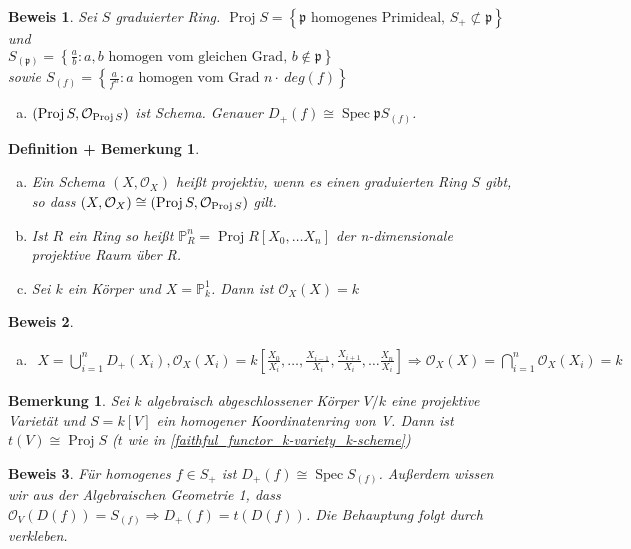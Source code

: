 \documentclass[a4paper,oneside]{scrbook}
\theoremstyle{break}
\newtheorem{DefBem}[Def]{Definition + Bemerkung}
\newtheorem{Bem}[Def]{Bemerkung}
\theoremstyle{nonumberbreak}
\theoremstyle{nonumberplain}
\newtheorem{Bew}{Beweis}
\theoremstyle{break}
\newcommand{\Spec}{%
	\ensuremath{\operatorname{Spec}}%
}
\newcommand{\Proj}{%
	\ensuremath{\operatorname{Proj}}%
}
\begin{document}
\begin{Bew}
 Sei $S$ graduierter Ring. $\Proj{S} = \left\lbrace \mathfrak{p} \text{ homogenes Primideal, } S_+ \not\subset \mathfrak{p} \right\rbrace$ und \\
$S_{(\mathfrak{p})}=\left\lbrace \frac{a}{b}: a,b \text{ homogen vom gleichen Grad, } b \notin \mathfrak{p} \right\rbrace $ \\
sowie $S_{(f)}=\left\lbrace \frac{a}{f^n}: a \text{ homogen vom Grad } n \cdot~ deg(f) \right\rbrace $
\begin{enumerate}[(g)]
 \item $(\Proj S, \mathcal{O}_{\Proj S})$ ist Schema. Genauer $D_+(f) \cong \Spec{\mathfrak{p} S_{(f)}}$.  
\end{enumerate}

\end{Bew}

\begin{DefBem}
	\begin{enumerate}[(a)]
		\item Ein Schema $(X,\mathcal{O}_X)$ heißt projektiv, wenn es einen graduierten Ring $S$ gibt, so dass $(X,\mathcal{O}_X) \cong (\Proj S, \mathcal{O}_{\Proj S})$  gilt.
		\item Ist $R$ ein Ring so heißt $\mathbb{P}^n_R = \Proj {R[X_0,\dots X_n]}$ der n-dimensionale projektive Raum über R.
		\item Sei $k$ ein Körper und $X=\mathbb{P}^1_k$. Dann ist $\mathcal{O}_X(X)=k$
	\end{enumerate}
\end{DefBem}
\begin{Bew}
	\begin{enumerate}[(c)]
		\item
			\begin{align*}
			 X = \bigcup_{i=1}^n D_+(X_i), \mathcal{O}_X(X_i)=k[\frac{X_0}{X_i},\dots,\frac{X_{i-1}}{X_i}, \frac{X_{i+1}}{X_i}, \dots \frac{X_n}{X_i} ] \Rightarrow \mathcal{O}_X(X) = \bigcap_{i=1}^n \mathcal{O}_X(X_i)=k
			\end{align*}
 
	\end{enumerate}
\end{Bew}

\begin{Bem}
	Sei $k$ algebraisch abgeschlossener Körper $V/k$ eine projektive Varietät und $S=k[V]$ ein homogener Koordinatenring von V. Dann ist $t(V) \cong \Proj S$ ($t$ wie in \ref{faithful_functor_k-variety_k-scheme})
\end{Bem}
\begin{Bew}
	Für homogenes $f \in S_+$ ist $D_+(f) \cong \Spec{S_{(f)}}$. Außerdem wissen wir aus der Algebraischen Geometrie 1, dass $\mathcal{O}_V(D(f))=S_{(f)} \Rightarrow D_+(f)=t(D(f))$.
	Die Behauptung folgt durch verkleben.
\end{Bew}
\end{document}
